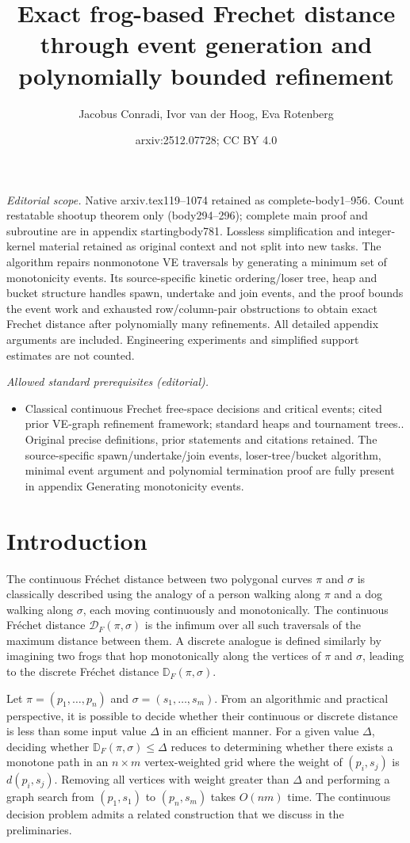 \documentclass[10pt,a4paper]{article}
\title{Exact frog-based Frechet distance through event generation and polynomially bounded refinement}
\author{Jacobus Conradi, Ivor van der Hoog, Eva Rotenberg}
\date{arxiv:2512.07728; CC BY 4.0}
\newcommand{\fd}{\mathcal{D}_F}
\newcommand{\dd}{\mathbb{D}_F}
\begin{document}
\maketitle
\noindent\textit{Editorial scope.} Native arxiv.tex119–1074 retained as complete-body1–956. Count restatable shootup theorem only (body294–296); complete main proof and subroutine are in appendix startingbody781. Lossless simplification and integer-kernel material retained as original context and not split into new tasks. The algorithm repairs nonmonotone VE traversals by generating a minimum set of monotonicity events. Its source-specific kinetic ordering/loser tree, heap and bucket structure handles spawn, undertake and join events, and the proof bounds the event work and exhausted row/column-pair obstructions to obtain exact Frechet distance after polynomially many refinements. All detailed appendix arguments are included. Engineering experiments and simplified support estimates are not counted.\par\medskip
\noindent\textit{Allowed standard prerequisites (editorial).}\begin{itemize}
\item Classical continuous Frechet free-space decisions and critical events; cited prior VE-graph refinement framework; standard heaps and tournament trees.. Original precise definitions, prior statements and citations retained. The source-specific spawn/undertake/join events, loser-tree/bucket algorithm, minimal event argument and polynomial termination proof are fully present in appendix Generating monotonicity events.
\end{itemize}\medskip
\section{Introduction}

The continuous Fréchet distance between two polygonal curves $\pi$ and $\sigma$ is classically described using the analogy of a person walking along $\pi$ and a dog walking along $\sigma$, each moving continuously and monotonically. The continuous Fréchet distance $\fd(\pi, \sigma)$ is the infimum over all such traversals of the maximum distance between them. A discrete analogue is defined similarly by imagining two frogs that hop monotonically along the vertices of $\pi$ and $\sigma$, leading to the discrete Fréchet distance $\dd(\pi, \sigma)$.

Let $\pi = (p_1,\ldots,p_n)$ and $\sigma = (s_1,\ldots,s_m)$. From an algorithmic and practical perspective, it is possible to decide whether their continuous or discrete distance is less than some input value $\Delta$ in an efficient manner. For a given value $\Delta$, deciding whether $\dd(\pi, \sigma) \leq \Delta$ reduces to determining whether there exists a monotone path in an $n \times m$ vertex-weighted grid where the weight of $(p_i, s_j)$ is $d(p_i, s_j)$. Removing all vertices with weight greater than $\Delta$ and performing a graph search from $(p_1, s_1)$ to $(p_n, s_m)$ takes $O(n m)$ time. The continuous decision problem admits a related construction that we discuss in the preliminaries.
\end{document}
